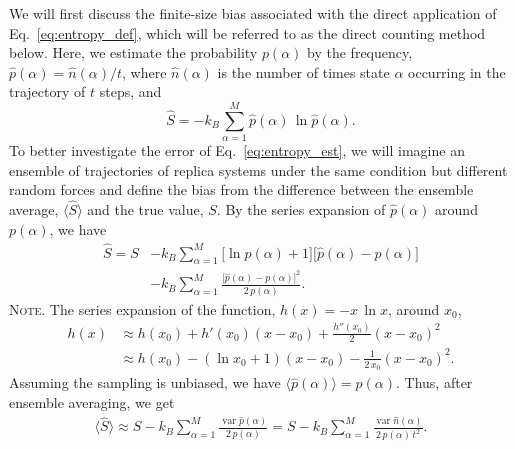 \documentclass[preprint, superscriptaddress]{revtex4-1}
\newcommand{\note}[1]{{\color{DarkGreen}\footnotesize \textsc{Note.} #1}}
\begin{document}
We will first discuss the finite-size bias associated with
the direct application of Eq.~\eqref{eq:entropy_def},
which will be referred to as the direct counting method below.
%
Here, we estimate the probability $p(\alpha)$
by the frequency, $\hat{p}(\alpha) = \hat{n}(\alpha) / t$,
where $\hat{n}(\alpha)$ is the number of times state $\alpha$ occurring in the trajectory of $t$ steps,
and
%
\begin{equation}
  \hat S
  =
  -k_B \sum_{\alpha = 1}^M \hat{p}(\alpha) \, \ln \hat{p}(\alpha)
  .
  \label{eq:entropy_est}
\end{equation}
%
To better investigate the error of Eq.~\eqref{eq:entropy_est},
we will imagine an ensemble of trajectories of replica systems
under the same condition but different random forces
and define the bias from the difference
between the ensemble average,
$\langle \hat S \rangle$
and the true value, $S$.
%
By the series expansion of $\hat{p}(\alpha)$ around $p(\alpha)$, we have
%
\begin{align*}
  \hat S
  =
  S
  &- k_B \sum_{\alpha = 1}^M
    \bigl[\ln p(\alpha) + 1 \bigr]
    \bigl[ \hat{p}(\alpha) - p(\alpha) \bigr]
  \\
  &- k_B \sum_{\alpha = 1}^M
    \frac{ \bigl[ \hat{p}(\alpha) - p(\alpha) \bigr]^2 } { 2 \, p(\alpha) }
  .
\end{align*}
%
\note{The series expansion of the function, $h(x) = -x \, \ln x$,
around $x_0$,
%
\begin{align*}
  h(x)
  &\approx h(x_0) + h'(x_0) (x - x_0) + \frac{h''(x_0)}{2} (x - x_0)^2 \\
  &\approx h(x_0) - (\ln x_0 + 1) ( x - x_0) - \frac{1}{2 \, x_0} (x - x_0)^2
  .
\end{align*}
}
%
Assuming the sampling is unbiased,
we have $\langle \hat{p}(\alpha) \rangle = p(\alpha)$.
%
Thus, after ensemble averaging, we get
%
\begin{align}
  \bigl\langle \hat S \bigr\rangle
  \approx
  S - k_B \sum_{\alpha = 1}^M
    \frac{ \operatorname{var} \hat{p}(\alpha) } { 2 \, p(\alpha) }
  =
  S - k_B \sum_{\alpha = 1}^M
    \frac{ \operatorname{var} \hat{n}(\alpha) } { 2 \, p(\alpha) \, t^2 }
  .
  \label{eq:entest_2nd}
\end{align}
\end{document}

